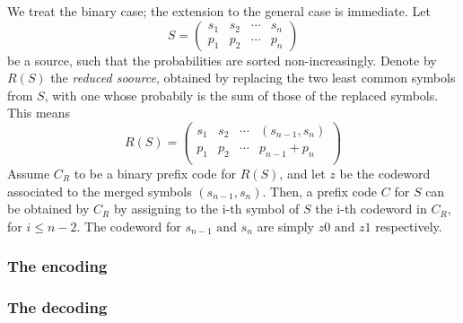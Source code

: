 \documentclass{subfiles}
\begin{document}
    We treat the binary case; the extension to the general case is immediate.
    Let 
    \[
        S = \begin{pmatrix}
            s_{1} & s_{2} & \cdots & s_{n} \\ 
            p_{1} & p_{2} & \cdots & p_{n} 
        \end{pmatrix}
    \]
    be a source, such that the probabilities are sorted non-increasingly.
    Denote by \(R(S)\) the \emph{reduced soource}, 
        obtained by replacing the two least common symbols from \(S\),
        with one whose probabily is the sum of those of the replaced symbols.
        This means 
        \[
            R(S) = \begin{pmatrix}
                s_{1} & s_{2} & \cdots & (s_{n - 1}, s_{n}) \\ 
                p_{1} & p_{2} & \cdots & p_{n - 1} + p_{n} \\
            \end{pmatrix}
        \]
    Assume \(C_{R}\) to be a binary prefix code for \(R(S)\),
        and let \(z\) be the codeword associated to the merged symbols \((s_{n - 1}, s_{n})\).
    Then, a prefix code \(C\) for \(S\) can be obtained by \(C_{R}\) by assigning 
        to the i-th symbol of \(S\) the i-th codeword in \(C_{R}\),
        for \(i \le n - 2\). 
        The codeword for \(s_{n - 1} \text{ and } s_{n}\) are simply 
        \(z0 \text{ and } z1\) respectively.

    \clearpage 
    \subsubsection{The encoding}
    

    \subsubsection{The decoding}
    
\end{document}
